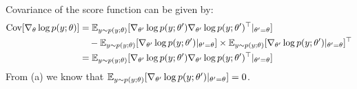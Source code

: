 \begin{answer}
Covariance of the score function can be given by:
\begin{align*}
\text{Cov}[\nabla_{\theta} \log p(y;\theta)]
&=\mathbb{E}_{y\sim p(y;\theta)}[\nabla_{\theta'} \log p(y;\theta') \nabla_{\theta'} \log p(y;\theta')^\top|_{\theta'=\theta}] \\
&\quad -\mathbb{E}_{y\sim p(y;\theta)}[\nabla_{\theta'} \log p(y;\theta')|_{\theta'=\theta}]\times\mathbb{E}_{y\sim p(y;\theta)}[\nabla_{\theta'} \log p(y;\theta')|_{\theta'=\theta}]^\top \\
&=\mathbb{E}_{y\sim p(y;\theta)}[\nabla_{\theta'} \log p(y;\theta')\nabla_{\theta'} \log p(y;\theta')^\top|_{\theta'=\theta}]
\end{align*}
From (a) we know that
$\mathbb{E}_{y\sim p(y;\theta)}[\nabla_{\theta'} \log p(y;\theta')|_{\theta'=\theta}]=0$.
\end{answer}
